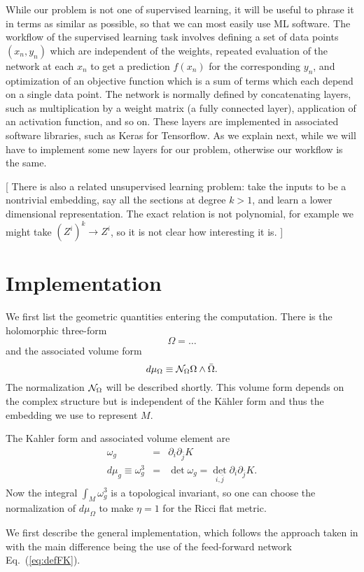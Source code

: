 \documentclass[12pt]{article}
\def\CN {{\cal N}}
\newcommand{\eq}[1]{Eq.~(\ref{eq:#1})}
\newcommand{\be}{\begin{equation}}
\newcommand{\ee}{\end{equation}}
\newcommand{\bea}{\begin{eqnarray}}
\newcommand{\eea}{\end{eqnarray}}
\def\bj{{\bar{j}}}
\begin{document}
While our problem is not one of supervised learning, it will be useful to phrase it in terms as similar
as possible, so that we can most easily use ML software.  The workflow of the supervised learning task involves defining
a set of data points $(x_n,y_n)$ which are independent of the weights, repeated evaluation of the network at each $x_n$
to get a prediction $f(x_n)$ for the corresponding $y_n$, and optimization of an objective function which is
a sum of terms which each depend on a single data point.
The network is normally defined by concatenating layers, such as multiplication by a weight matrix
(a fully connected layer), application of an activation function, and so on.  These layers are implemented
in associated software libraries, such as Keras for Tensorflow.  As we explain next,
while we will have to implement some new layers for our problem, otherwise our workflow is the same.

[ There is also a related unsupervised learning problem:  take the inputs to be a nontrivial embedding, say
all the sections at degree $k>1$, and learn a lower dimensional representation.  The exact relation is not polynomial,
for example we might take $(Z^i)^k \rightarrow Z^i$, so it is not clear how interesting it is. ]

\section{ Implementation }

We first list the geometric quantities entering the computation.
There is the holomorphic three-form
\be
\Omega = \ldots 
\ee
and the associated volume form
\be
d\mu_\Omega \equiv \CN_\Omega \Omega \wedge \bar\Omega .
\ee
The normalization $\CN_\Omega$ will be described shortly.  
This volume form depends on the complex structure but is independent of the K\"ahler form
and thus the embedding we use to represent $M$.

The Kahler form and associated volume element are
\bea \label{eq:omegag}
\omega_g &=& \partial_i \partial_\bj K \\
\label{eq:MA}
d\mu_g \equiv \omega_g^3 &=& \det \omega_g = \det_{i,\bj} \partial_i \partial_\bj K .
\eea
Now the integral $\int_M\omega_g^3$ is a topological invariant, so one can choose the normalization
of $d\mu_\Omega$ to make $\eta=1$ for the Ricci flat metric.  


We first describe the general implementation, which follows the approach taken in \cite{}
with the main difference being the use of the feed-forward network \eq{defFK}.
\end{document}
